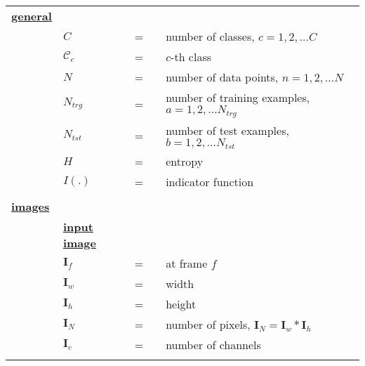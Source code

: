 \documentclass{article}
\begin{document}
\begin{longtable}{llllp{3in}}
\textbf{\color{red} \underline{general}}&&&&\\
&$C$   						&=&& number of classes, $c=1, 2, \ldots C$						\\
&$\mathcal{C}_c$			&=&& $c$-th class 												\\
&$N$   					&=&& number of data points, $n =1, 2, \ldots N	$				\\
&$N_{trg}$   				&=&& number of training examples, $a =1, 2, \ldots N_{trg}$	\\
&$N_{tst}$  				&=&& number of test examples, $b= 1, 2, \ldots N_{tst}$		\\
&$H$ 						&=&& entropy														\\ 
&$I(.)$						&=&& indicator function											\\\\


\textbf{\color{red} \underline{images}}&&&&																				\\
&\textbf{\underline{input image}}&&&																						\\	
&$\mathbf{I}_f$    		&=&& at frame $f$																				\\
&$\mathbf{I}_w$    		&=&& width																						\\
&$\mathbf{I}_h$    		&=&& height																						\\
&$\mathbf{I}_N$    		&=&& number of pixels, $\mathbf{I}_N=\mathbf{I}_w*\mathbf{I}_h$							\\
&$\mathbf{I}_c$    		&=&& number of channels																		\\ \\


\end{longtable}
\end{document}

